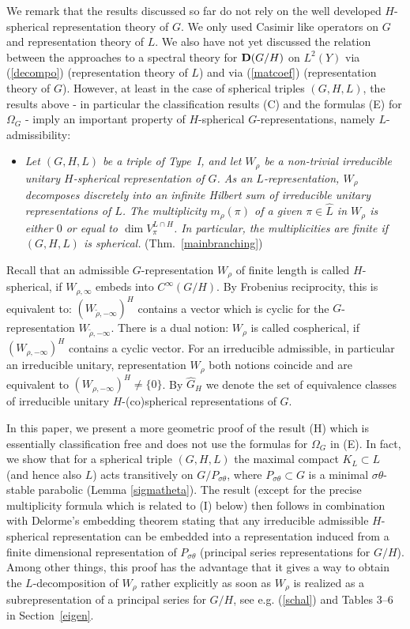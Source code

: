\documentclass[10]{amsart}
\theoremstyle{remark}
\theoremstyle{definition}
\numberwithin{equation}{section}
\begin{document}
We remark that the results discussed so far do not rely on the well developed $H$-spherical representation theory of $G$. We only used Casimir like operators on $G$
and representation theory of $L$. We also have not yet discussed the relation between the approaches to a spectral theory for ${\bf D}(G/H)$ on $L^2(Y)$ via (\ref{decompo})
(representation theory of $L$) and via (\ref{matcoef}) (representation theory of $G$). However, at least in the case of spherical triples $(G,H,L)$, the results above - in particular the classification results ({C}) and the formulas ({E})
for $\Omega_G$ -  imply an important property of $H$-spherical $G$-representations, namely $L$-admissibility:
\begin{itemize}
\item[({\bf H})] {\em Let $(G,H,L)$ be a triple of Type~I, and let $W_\rho$ be a non-trivial  irreducible unitary $H$-spherical representation of $G$.  As an $L$-representation, $W_\rho$ decomposes discretely into an infinite Hilbert sum of irreducible unitary representations of $L$. The multiplicity $m_\rho(\pi)$ of a given $\pi\in\widehat L$ in $W_\rho$ is either $0$ or equal to $\dim V_\pi^{L\cap H}$. In particular, the multiplicities are finite if $(G,H,L)$ is spherical.} (Thm.~\ref{mainbranching})
\end{itemize}
Recall that an admissible $G$-representation $W_\rho$ of finite length is called $H$-spherical, if $W_{\rho,\infty}$ embeds into $C^\infty(G/H)$. By Frobenius reciprocity, this
is equivalent to: $(W_{\tilde\rho,-\infty})^H$ contains a vector which is cyclic for the $G$-representation $W_{\tilde\rho,-\infty}$. There is a dual notion: $W_\rho$
is called cospherical, if $(W_{\rho,-\infty})^H$ contains a cyclic vector. For an irreducible admissible, in particular an irreducible unitary, representation $W_\rho$ both notions coincide and are equivalent to $(W_{\rho,-\infty})^H\ne\{0\}$. By $\widehat G_H$ we denote the set of equivalence classes of irreducible unitary $H$-(co)spherical representations of $G$.

In this paper, we present a more geometric proof of the result ({H}) which is essentially classification free and does not use the formulas for $\Omega_G$ in ({E}). In fact, we show 
that for a spherical triple $(G,H,L)$ the maximal compact $K_L\subset L$ (and hence also $L$) acts transitively on $G/P_{\sigma\theta}$, where $P_{\sigma\theta}\subset G$
is a minimal $\sigma\theta$-stable parabolic (Lemma \ref{sigmatheta}). The result (except for the precise multiplicity formula which is related to (I) below) then follows in combination with Delorme's embedding theorem stating that any irreducible admissible
$H$-spherical representation can be embedded into a representation induced from a finite dimensional representation of $P_{\sigma\theta}$ (principal series representations for $G/H$).
Among other things, this proof has the advantage that it gives a way to obtain the $L$-decomposition of $W_\rho$ rather explicitly as soon as $W_\rho$ is realized as
a subrepresentation of a principal series for $G/H$, see e.g. (\ref{schal}) and Tables 3--6 in Section~\ref{eigen}.
\end{document}
